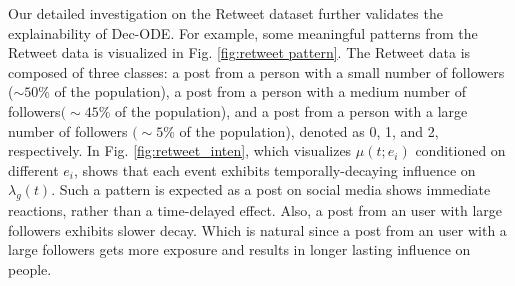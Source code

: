 Our detailed investigation on the Retweet dataset further validates the explainability of Dec-ODE. 
For example, some meaningful patterns from the Retweet data is visualized in Fig. \ref{fig:retweet pattern}.
The Retweet data is composed of three classes: 
a post from a person with a small number of followers ($\sim50\%$ of the population),
a post from a person with a medium number of followers$(\sim45\%$ of the population), 
and a post from a person with a large number of followers $(\sim5\%$ of the population), denoted as 0, 1, and 2, respectively.
In Fig. \ref{fig:retweet_inten}, which visualizes $\mu(t;e_i)$ conditioned on different $e_i$, shows that each event exhibits temporally-decaying influence on $\lambda_g(t)$.
Such a pattern is expected as a post on social media shows immediate reactions, rather than a time-delayed effect.
Also, a post from an user with large followers exhibits slower decay.
Which is natural since a post from an user with a large followers gets more exposure and results in longer lasting influence on people.



